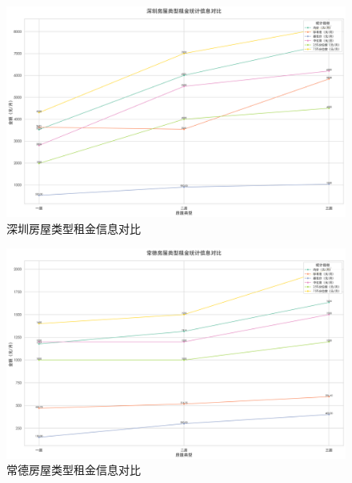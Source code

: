 \begin{figure}[htbp]
    \centering
    \includegraphics[width=0.7\linewidth]{../../figure/sz_room_price_line_chart.png}
    \caption{深圳房屋类型租金信息对比}
    \label{fig:sz_room_price_line_chart}
\end{figure}
\begin{figure}[htbp]
    \centering
    \includegraphics[width=0.7\linewidth]{../../figure/changde_room_price_line_chart.png}
    \caption{常德房屋类型租金信息对比}
    \label{fig:changde_room_price_line_chart}
\end{figure}


